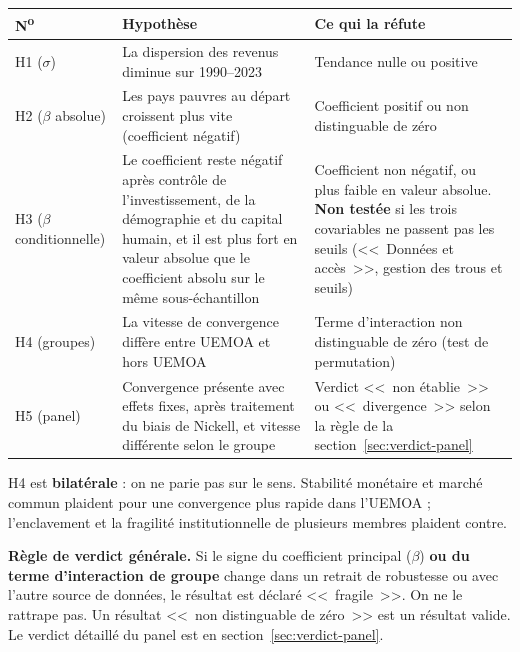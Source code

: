 \documentclass[14pt,a4paper]{article}
\newcommand{\sig}{\texorpdfstring{$\sigma$}{sigma}}
\newcommand{\bet}{\texorpdfstring{$\beta$}{beta}}
\begin{document}
	\begin{center}
		\small
		\begin{tabularx}{\textwidth}{@{}l>{\raggedright\arraybackslash}X>{\raggedright\arraybackslash}X@{}}
			\toprule
			\textbf{N\textsuperscript{o}} & \textbf{Hypothèse} & \textbf{Ce qui la réfute} \\
			\midrule
			H1 (\sig) & La dispersion des revenus diminue sur 1990--2023 & Tendance nulle ou positive \\
			\addlinespace
			H2 (\bet{} absolue) & Les pays pauvres au départ croissent plus vite (coefficient négatif) & Coefficient positif ou non distinguable de zéro \\
			\addlinespace
			H3 (\bet{} conditionnelle) & Le coefficient reste négatif après contrôle de l'investissement, de la démographie et du capital humain, et il est plus fort en valeur absolue que le coefficient absolu sur le même sous-échantillon & Coefficient non négatif, ou plus faible en valeur absolue. \textbf{Non testée} si les trois covariables ne passent pas les seuils (<<~Données et accès~>>, gestion des trous et seuils) \\
			\addlinespace
			H4 (groupes) & La vitesse de convergence diffère entre UEMOA et hors UEMOA & Terme d'interaction non distinguable de zéro (test de permutation) \\
			\addlinespace
			H5 (panel) & Convergence présente avec effets fixes, après traitement du biais de Nickell, et vitesse différente selon le groupe & Verdict <<~non établie~>> ou <<~divergence~>> selon la règle de la section~\ref{sec:verdict-panel} \\
			\bottomrule
		\end{tabularx}
	\end{center}
	
	H4 est \textbf{bilatérale} : on ne parie pas sur le sens. Stabilité monétaire et marché commun plaident pour une convergence plus rapide dans l'UEMOA ; l'enclavement et la fragilité institutionnelle de plusieurs membres plaident contre.
	
	\textbf{Règle de verdict générale.} Si le signe du coefficient principal (\bet) \textbf{ou du terme d'interaction de groupe} change dans un retrait de robustesse ou avec l'autre source de données, le résultat est déclaré <<~fragile~>>. On ne le rattrape pas. Un résultat <<~non distinguable de zéro~>> est un résultat valide. Le verdict détaillé du panel est en section~\ref{sec:verdict-panel}.
	
\end{document}
